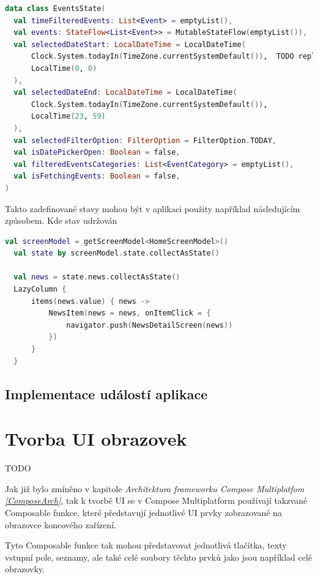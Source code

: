 \begin{lstlisting}[caption={Event State katalog}, label={lst:EventState}, language=Kotlin]
data class EventsState(
  val timeFilteredEvents: List<Event> = emptyList(),
  val events: StateFlow<List<Event>> = MutableStateFlow(emptyList()),
  val selectedDateStart: LocalDateTime = LocalDateTime(
      Clock.System.todayIn(TimeZone.currentSystemDefault()),  TODO replace by current impl
      LocalTime(0, 0)
  ),
  val selectedDateEnd: LocalDateTime = LocalDateTime(
      Clock.System.todayIn(TimeZone.currentSystemDefault()),
      LocalTime(23, 59)
  ),
  val selectedFilterOption: FilterOption = FilterOption.TODAY,
  val isDatePickerOpen: Boolean = false,
  val filteredEventsCategories: List<EventCategory> = emptyList(),
  val isFetchingEvents: Boolean = false,
)
\end{lstlisting}

Takto zadefinované stavy mohou být v aplikaci použity například následujícím způsobem. Kde stav udržován 

\begin{lstlisting}[caption={Použití stavu v aplikaci}, label={lst:StateImpl}, language=Kotlin]
  val screenModel = getScreenModel<HomeScreenModel>()
  val state by screenModel.state.collectAsState()

  val news = state.news.collectAsState()
  LazyColumn {
      items(news.value) { news ->
          NewsItem(news = news, onItemClick = {
              navigator.push(NewsDetailScreen(news))
          })
      }
  }
\end{lstlisting}

\subsection{Implementace událostí aplikace} \label{eventHandlingImpl}


\section{Tvorba UI obrazovek}
TODO %

Jak již bylo zmíněno v kapitole \textit{Architektura frameworku Compose Multiplatfom \ref{ComposeArch}}, tak k tvorbě UI se v Compose Multiplatform používají 
takzvané Composable funkce, které představují jednotlivé UI prvky zobrazované na obrazovce koncového zařízení. 

Tyto Composable funkce tak mohou představovat jednotlivá tlačítka, texty vstupní pole, seznamy, ale také celé soubory těchto prvků jako jsou 
například celé obrazovky.

